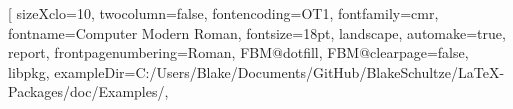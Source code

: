 \RequirePackage%
[%
    sizeXclo=10,
    twocolumn=false,%
    fontencoding=OT1,
    fontfamily=cmr,
    fontname={Computer Modern Roman},
    fontsize=18pt,
    landscape,
    automake=true,
    report,
    frontpagenumbering=Roman,
    FBM@dotfill,
    FBM@clearpage=false,
    libpkg,                                            %
    exampleDir={C:/Users/Blake/Documents/GitHub/BlakeSchultze/LaTeX-Packages/doc/Examples/},
